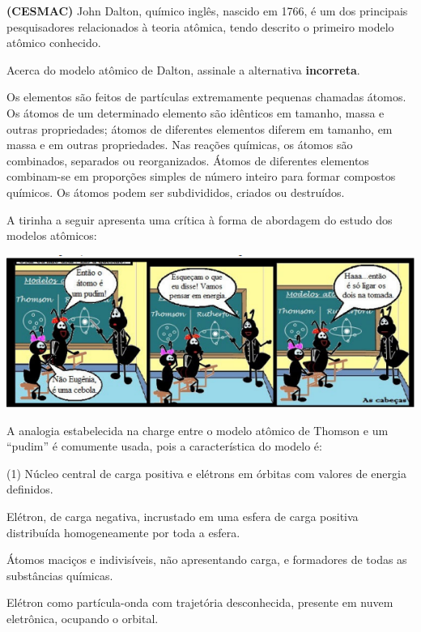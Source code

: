 \documentclass[9 pt]{scrartcl}
\def\PQ{0.84} %
\begin{document}
\begin{exercise}[points=\PQ]
\textbf{(CESMAC)} John Dalton, químico inglês, nascido em 1766, é um dos principais pesquisadores relacionados à teoria atômica, tendo descrito o primeiro modelo atômico conhecido.

Acerca do modelo atômico de Dalton, assinale a alternativa \textbf{incorreta}.

\begin{choice}
\choice Os elementos são feitos de partículas extremamente pequenas chamadas átomos.
\choice Os átomos de um determinado elemento são idênticos em tamanho, massa e outras propriedades; átomos de diferentes elementos diferem em tamanho, em massa e em outras propriedades.
\choice Nas reações químicas, os átomos são combinados, separados ou reorganizados.
\choice Átomos de diferentes elementos combinam-se em proporções simples de número inteiro para formar compostos químicos.
\choice Os átomos podem ser subdivididos, criados ou destruídos.
\end{choice}
\end{exercise}


\begin{exercise}[points=\PQ]
A tirinha a seguir apresenta uma crítica à forma de abordagem do estudo dos modelos atômicos:

\begin{center}
\includegraphics[width=.9\linewidth]{Quimica_Geral/TeoriaAtomica/charge3.png}
\end{center}

A analogia estabelecida na charge entre o modelo atômico de Thomson e um “pudim” é comumente usada, pois a característica do modelo é:

\begin{choice}(1)
\choice Núcleo central de carga positiva e elétrons em órbitas com valores de energia definidos.

\choice Elétron, de carga negativa, incrustado em uma esfera de carga positiva distribuída homogeneamente por toda a esfera. 

\choice Átomos maciços e indivisíveis, não apresentando carga, e formadores de todas as substâncias químicas. 

\choice Elétron como partícula-onda com trajetória desconhecida, presente em nuvem eletrônica, ocupando o orbital.
\end{choice}
\end{exercise}
\end{document}
